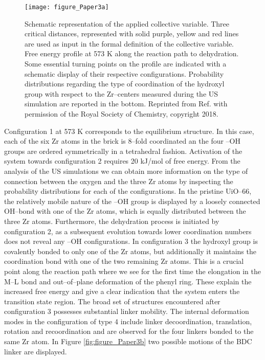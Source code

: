\begin{figure}[!htp]
	\centering
	\texttt{[image: figure\_Paper3a]}
	\caption[Schematic representation of the applied collective variable. Three
	critical  distances, represented with solid purple, yellow and red
	lines are used as input in the formal definition of the collective variable.
	Free energy profile at 573 K along the reaction path to dehydration. Some
	essential turning points on the profile are indicated with a schematic display
	of their respective configurations. Probability distributions regarding the
	type of coordination of the hydroxyl group with respect to the Zr--centers
	measured during the US simulation are reported in the bottom.]{Schematic representation of the applied collective variable. Three
	critical  distances, represented with solid purple, yellow and red
	lines are used as input in the formal definition of the collective variable.
	Free energy profile at 573 K along the reaction path to dehydration. Some
	essential turning points on the profile are indicated with a schematic display
	of their respective configurations. Probability distributions regarding the
	type of coordination of the hydroxyl group with respect to the Zr--centers
	measured during the US simulation are reported in the bottom. Reprinted from
	Ref.\cite{Hajek2018} with permission of the Royal Society of
Chemistry, copyright 2018.}
	\label{fig:figure_Paper3a}
\end{figure}
\npar
Configuration 1 at 573 K corresponds to the equilibrium structure.
In this case, each of the six Zr atoms in the brick is 8--fold
coordinated an the four --OH groups are ordered
symmetrically in a tetrahedral fashion. Activation of the system towards configuration 2 requires
20 kJ/mol of free energy. From the analysis of the US simulations we can obtain more
information on the type of connection between the oxygen and the three Zr atoms
by inspecting the probability distributions for each of
the configurations. In the pristine UiO--66, the relatively mobile nature of the
--OH group is displayed by a loosely connected
OH--bond with one of the Zr atoms, which is equally distributed between the three Zr atoms. Furthermore,
the dehydration process is initiated by configuration 2, as a subsequent
evolution towards lower coordination numbers does not reveal any
--OH configurations. In configuration 3 the
hydroxyl group is covalently bonded to only one of the Zr atoms, but
additionally it maintains the coordination bond with one of the two remaining Zr
atoms.
This is a crucial point along the reaction path where we see for the first
time the elongation in the M--L bond and out--of--plane deformation of the
phenyl ring. These explain the increased free energy and give a clear
indication that the system enters the transition state region. The broad set of
structures encountered after configuration 3 possesses substantial linker
mobility. The internal deformation modes in the configuration of type 4 include
linker decoordination, translation, rotation and recoordination and are observed
for the four linkers bonded to the same Zr atom. In Figure \ref{fig:figure_Paper3b} two possible
motions of the BDC linker are displayed.

